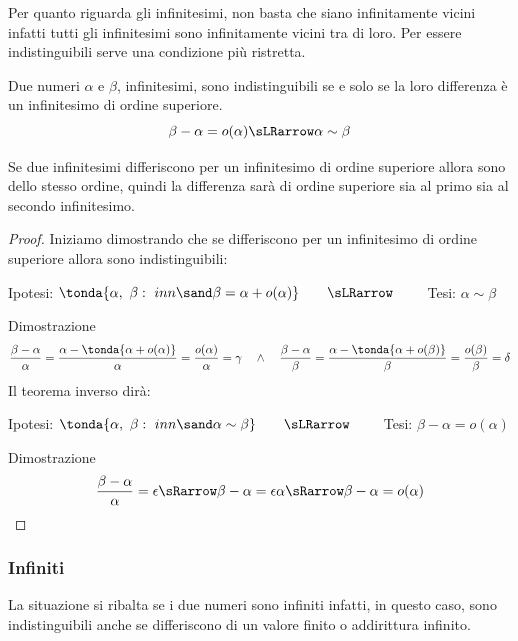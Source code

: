 Per quanto riguarda gli infinitesimi, non basta che siano infinitamente 
vicini infatti tutti gli infinitesimi sono infinitamente vicini tra di loro.
Per essere indistinguibili serve una condizione più ristretta.

\begin{teorema}
Due numeri \(\alpha\) e \(\beta\), infinitesimi, 
sono indistinguibili se e solo se la loro differenza è un infinitesimo di 
ordine superiore.
\[\beta-\alpha = o(\alpha) \sLRarrow \alpha \sim \beta\] 
\end{teorema}

\begin{osservazione}
 Se due infinitesimi differiscono per un infinitesimo di ordine superiore 
allora sono dello stesso ordine, quindi la differenza sarà di ordine 
superiore sia al primo sia al secondo infinitesimo.
\end{osservazione}

\begin{proof}
Iniziamo dimostrando che se differiscono per un infinitesimo di ordine 
superiore allora sono indistinguibili:
\begin{center}
Ipotesi: $\tonda{\alpha,~\beta:\ inn \sand \beta = \alpha +o(\alpha)}
\qquad \sLRarrow\qquad$ 
Tesi: $\alpha \sim \beta$
\end{center}
Dimostrazione
\[\frac{\beta-\alpha}{\alpha}=
\frac{\alpha-\tonda{\alpha +o(\alpha)}}{\alpha} = 
\frac{o(\alpha)}{\alpha}= \gamma \quad \wedge \quad 
\frac{\beta-\alpha}{\beta}=
\frac{\alpha-\tonda{\alpha +o(\beta)}}{\beta} = 
\frac{o(\beta)}{\beta}= \delta
\]
Il teorema inverso dirà:
\begin{center}
Ipotesi: $\tonda{\alpha,~\beta:\ inn \sand \alpha \sim \beta}
\qquad \sLRarrow \qquad$ 
Tesi: \(\beta-\alpha = o(\alpha)\)
\end{center}
Dimostrazione
\[\frac{\beta - \alpha}{\alpha} = \epsilon \sRarrow 
\beta - \alpha =\epsilon \alpha \sRarrow 
\beta - \alpha = o(\alpha)
\]
\end{proof}

\subsubsection{Infiniti}
\label{subsubsec:insnum_infiniti}

La situazione si ribalta se i due numeri sono infiniti infatti, in 
questo caso, sono indistinguibili anche se differiscono di 
un valore finito o addirittura infinito. 

